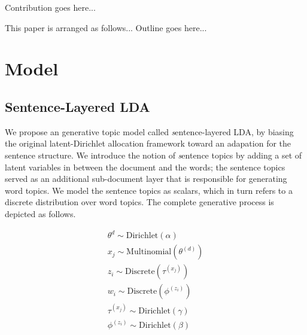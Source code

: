 {\color{red} Contribution goes here...}

This paper is arranged as follows... {\color{red} Outline goes here...}

\section{Model}
\subsection{Sentence-Layered LDA}

We propose an generative topic model called {\emph sentence-layered LDA}, by
biasing the original latent-Dirichlet allocation framework toward an adapation
{for} the sentence structure.  We introduce the notion of {\emph sentence
topics} by adding a set of latent variables in between the document and the
words; the sentence topics served as an additional sub-document layer that is
responsible for generating word topics.  We model the sentence topics as
scalars, which in turn refers to a discrete distribution over word topics.  The
complete generative process is depicted as follows.

\begin{eqnarray*}
  \theta^{d} \sim \mathrm{Dirichlet}(\alpha) \\
  x_j \sim \mathrm{Multinomial}(\theta^{(d)}) \\
  z_i \sim \mathrm{Discrete}(\tau^{(x_j)}) \\
  w_i \sim \mathrm{Discrete}(\phi^{(z_i)}) \\
  \tau^{(x_j)} \sim \mathrm{Dirichlet}(\gamma) \\
  \phi^{(z_i)} \sim \mathrm{Dirichlet}(\beta) 
\end{eqnarray*}

